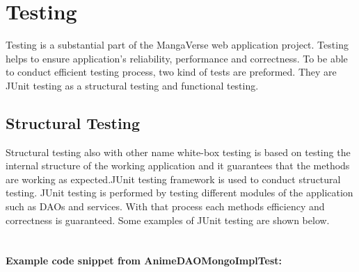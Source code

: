 \chapter{Testing}
Testing is a substantial part of the MangaVerse web application project. Testing helps to ensure application's 
reliability, performance and correctness. To be able to conduct efficient testing process, two kind of tests are preformed.
They are JUnit testing as a structural testing and functional testing.

\section{Structural Testing}
Structural testing also with other name white-box testing is based on testing the internal structure of the working application and it 
guarantees that the methods are working as expected.JUnit testing framework is used to conduct structural testing. JUnit testing is performed by testing 
different modules of the application such as DAOs and services. With that process each methods efficiency and correctness is guaranteed. 
Some examples of JUnit testing are shown below.\\ \\


\subsubsection*{Example code snippet from AnimeDAOMongoImplTest:}

